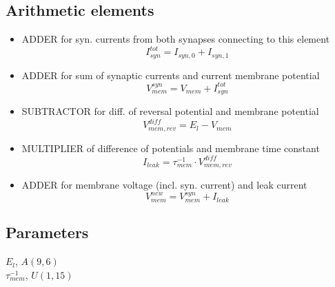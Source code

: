 \documentclass[a4paper]{report}
\begin{document}
\subsection{Arithmetic elements}
\begin{itemize}
	\item ADDER for syn. currents from both synapses connecting to this element
		\begin{equation}
			I_{syn}^{tot} = I_{syn,0} + I_{syn,1}
		\end{equation}
	\item ADDER for sum of synaptic currents and current membrane potential
		\begin{equation}
			V_{mem}^{syn} = V_{mem} + I_{syn}^{tot}
		\end{equation}
	\item SUBTRACTOR for diff. of reversal potential and membrane potential
		\begin{equation}
			V_{mem,rev}^{diff} = E_l - V_{mem}
		\end{equation}
	\item MULTIPLIER of difference of potentials and membrane time constant
		\begin{equation}
			I_{leak} = \tau_{mem}^{-1} \cdot V_{mem,rev}^{diff}
		\end{equation}
	\item ADDER for membrane voltage (incl. syn. current) and leak current
		\begin{equation}
			V_{mem}^{new} = V_{mem}^{syn} + I_{leak}
		\end{equation}
\end{itemize}
\subsection{Parameters}
$E_l$, $A(9,6)$\\
$\tau_{mem}^{-1}$, $U(1,15)$\\
\end{document}
